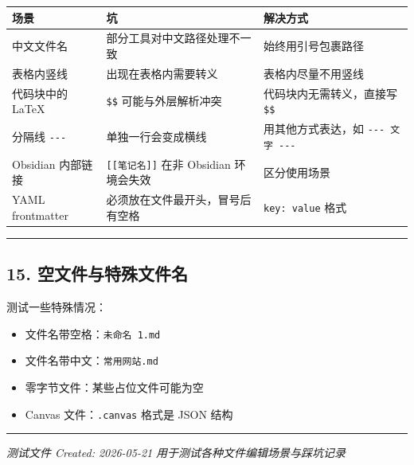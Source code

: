 \begin{longtable}[]{@{}
  >{\raggedright\arraybackslash}p{}
  >{\raggedright\arraybackslash}p{}
  >{\raggedright\arraybackslash}p{}@{}}
\toprule\noalign{}
\begin{minipage}[b]{\linewidth}\raggedright
场景
\end{minipage} & \begin{minipage}[b]{\linewidth}\raggedright
坑
\end{minipage} & \begin{minipage}[b]{\linewidth}\raggedright
解决方式
\end{minipage} \\
\midrule\noalign{}
\endhead
\bottomrule\noalign{}
\endlastfoot
中文文件名 & 部分工具对中文路径处理不一致 & 始终用引号包裹路径 \\
表格内竖线 & \texttt{\textbar{}} 出现在表格内需要转义 &
表格内尽量不用竖线 \\
代码块中的 LaTeX & \texttt{\$\$} 可能与外层解析冲突 &
代码块内无需转义，直接写 \texttt{\$\$} \\
分隔线 \texttt{-\/-\/-} & 单独一行会变成横线 & 用其他方式表达，如
\texttt{-\/-\/-\ 文字\ -\/-\/-} \\
Obsidian 内部链接 & \texttt{{[}{[}笔记名{]}{]}} 在非 Obsidian 环境会失效
& 区分使用场景 \\
YAML frontmatter & 必须放在文件最开头，冒号后有空格 &
\texttt{key:\ value} 格式 \\
\end{longtable}

\begin{center}\rule{0.5\linewidth}{0.5pt}\end{center}

\subsection{15.
空文件与特殊文件名}\label{ux7a7aux6587ux4ef6ux4e0eux7279ux6b8aux6587ux4ef6ux540d}

测试一些特殊情况：

\begin{itemize}
\tightlist
\item
  文件名带空格：\texttt{未命名\ 1.md}
\item
  文件名带中文：\texttt{常用网站.md}
\item
  零字节文件：某些占位文件可能为空
\item
  Canvas 文件：\texttt{.canvas} 格式是 JSON 结构
\end{itemize}

\begin{center}\rule{0.5\linewidth}{0.5pt}\end{center}

\emph{测试文件 Created: 2026-05-21}
\emph{用于测试各种文件编辑场景与踩坑记录}
